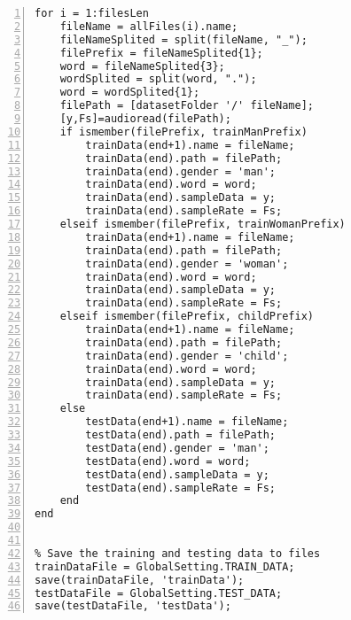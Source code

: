 \documentclass{article}
\begin{document}
\begin{lstlisting}[frame=single, numbers=left, style=Matlab-editor, caption={data\_exploration.m}, label={lst:data_exploration}]
% Loop through all files to categorize them into training and testing sets.
for i = 1:filesLen
    fileName = allFiles(i).name;
    fileNameSplited = split(fileName, "_");
    filePrefix = fileNameSplited{1};
    word = fileNameSplited{3};
    wordSplited = split(word, ".");
    word = wordSplited{1};
    filePath = [datasetFolder '/' fileName];
    [y,Fs]=audioread(filePath);
    if ismember(filePrefix, trainManPrefix)
        trainData(end+1).name = fileName;
        trainData(end).path = filePath;
        trainData(end).gender = 'man';
        trainData(end).word = word;
        trainData(end).sampleData = y;
        trainData(end).sampleRate = Fs;
    elseif ismember(filePrefix, trainWomanPrefix)
        trainData(end+1).name = fileName;
        trainData(end).path = filePath;
        trainData(end).gender = 'woman';
        trainData(end).word = word;
        trainData(end).sampleData = y;
        trainData(end).sampleRate = Fs;
    elseif ismember(filePrefix, childPrefix)
        trainData(end+1).name = fileName;
        trainData(end).path = filePath;
        trainData(end).gender = 'child';
        trainData(end).word = word;
        trainData(end).sampleData = y;
        trainData(end).sampleRate = Fs;
    else
        testData(end+1).name = fileName;
        testData(end).path = filePath;
        testData(end).gender = 'man';
        testData(end).word = word;
        testData(end).sampleData = y;
        testData(end).sampleRate = Fs;
    end
end


% Save the training and testing data to files
trainDataFile = GlobalSetting.TRAIN_DATA;
save(trainDataFile, 'trainData');
testDataFile = GlobalSetting.TEST_DATA;
save(testDataFile, 'testData');

\end{lstlisting}
\end{document}
